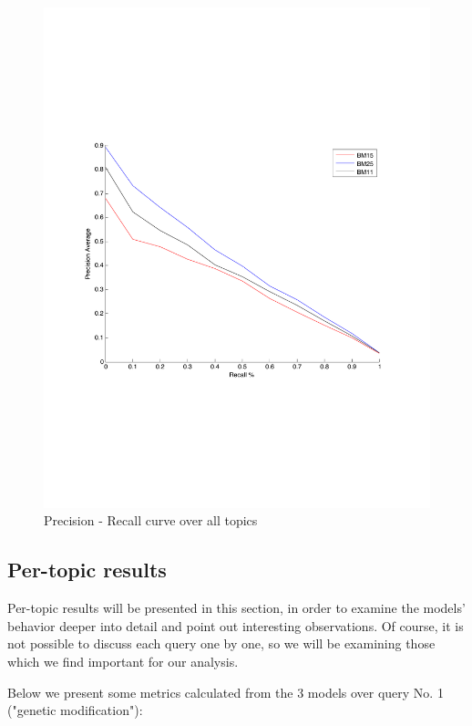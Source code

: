 \documentclass[letterpaper,11pt]{article}
\begin{document}
\begin{figure}[ht]
\centering
\includegraphics[scale = 0.75]{pr.pdf}
\caption{Precision - Recall curve over all topics}

\end{figure}



\subsection{Per-topic results}

Per-topic results will be presented in this section, in order to examine the models' behavior deeper into detail and point out interesting observations. Of course, it is not possible to discuss each query one by one, so we will be examining those which we find important for our analysis.

Below we present some metrics calculated from the 3 models over query No. 1 ("genetic modification"): 
\end{document}

